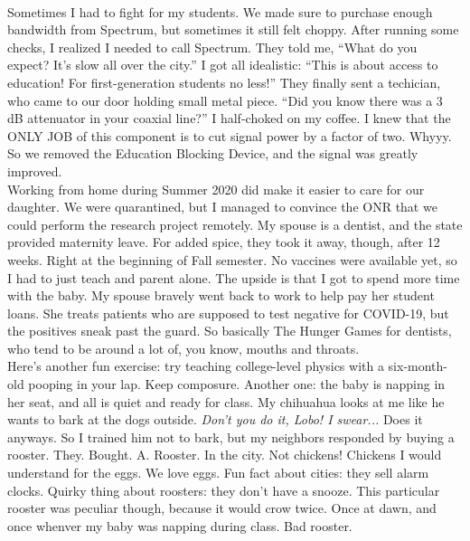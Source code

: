 \documentclass[../../main.tex]{subfiles}
\begin{document}
\\
\vspace{0.25cm}
Sometimes I had to fight for my students.  We made sure to purchase enough bandwidth from Spectrum, but sometimes it still felt choppy.  After running some checks, I realized I needed to call Spectrum.  They told me, ``What do you expect?  It's slow all over the city.''  I got all idealistic: ``This is about access to education!  For first-generation students no less!'' They finally sent a techician, who came to our door holding small metal piece.  ``Did you know there was a 3 dB attenuator in your coaxial line?''  I half-choked on my coffee.  I knew that the ONLY JOB of this component is to cut signal power by a factor of two.  Whyyy.  So we removed the Education Blocking Device, and the signal was greatly improved.
\\
\vspace{0.25cm}
Working from home during Summer 2020 did make it easier to care for our daughter.  We were quarantined, but I managed to convince the ONR that we could perform the research project remotely.  My spouse is a dentist, and the state provided maternity leave.  For added spice, they took it away, though, after 12 weeks.  Right at the beginning of Fall semester.  No vaccines were available yet, so I had to just teach and parent alone.  The upside is that I got to spend more time with the baby.  My spouse bravely went back to work to help pay her student loans.  She treats patients who are supposed to test negative for COVID-19, but the positives sneak past the guard.  So basically The Hunger Games for dentists, who tend to be around a lot of, you know, mouths and throats.
\\
\vspace{0.25cm}
Here's another fun exercise: try teaching college-level physics with a six-month-old pooping in your lap.  Keep composure.  Another one: the baby is napping in her seat, and all is quiet and ready for class.  My chihuahua looks at me like he wants to bark at the dogs outside.  \textit{Don't you do it, Lobo!  I swear...} Does it anyways.  So I trained him not to bark, but my neighbors responded by buying a rooster.  They. Bought. A. Rooster.  In the city.  Not chickens!  Chickens I would understand for the eggs.  We love eggs.  Fun fact about cities: they sell alarm clocks.  Quirky thing about roosters: they don't have a snooze.  This particular rooster was peculiar though, because it would crow twice.  Once at dawn, and once whenver my baby was napping during class.  Bad rooster.
\\
\end{document}
